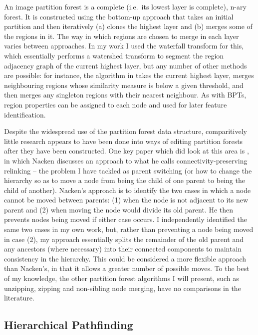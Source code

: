 An image partition forest is a complete (i.e.~its lowest layer is complete), n-ary forest. It is constructed using the bottom-up approach that takes an initial partition and then iteratively (a) clones the highest layer and (b) merges some of the regions in it. The way in which regions are chosen to merge in each layer varies between approaches. In my work I used the waterfall transform \cite{marcotegui05} for this, which essentially performs a watershed transform to segment the region adjacency graph of the current highest layer, but any number of other methods are possible: for instance, the algorithm in \cite{yu02} takes the current highest layer, merges neighbouring regions whose similarity measure is below a given threshold, and then merges any singleton regions with their nearest neighbour. As with BPTs, region properties can be assigned to each node and used for later feature identification.

Despite the widespread use of the partition forest data structure, comparitively little research appears to have been done into ways of editing partition forests after they have been constructed. One key paper which did look at this area is \cite{nacken95}, in which Nacken discusses an approach to what he calls connectivity-preserving relinking -- the problem I have tackled as parent switching (or how to change the hierarchy so as to move a node from being the child of one parent to being the child of another). Nacken's approach is to identify the two cases in which a node cannot be moved between parents: (1) when the node is not adjacent to its new parent and (2) when moving the node would divide its old parent. He then prevents nodes being moved if either case occurs. I independently identified the same two cases in my own work, but, rather than preventing a node being moved in case (2), my approach essentially splits the remainder of the old parent and any ancestors (where necessary) into their connected components to maintain consistency in the hierarchy. This could be considered a more flexible approach than Nacken's, in that it allows a greater number of possible moves. To the best of my knowledge, the other partition forest algorithms I will present, such as unzipping, zipping and non-sibling node merging, have no comparisons in the literature.

\subsection{Hierarchical Pathfinding}


